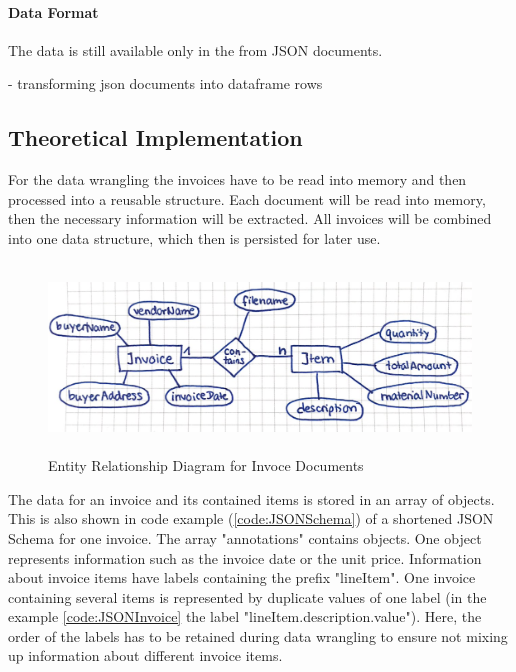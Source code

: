 \begin{table}[ht]
\begin{tabular}{c|lll}
            \end{tabular}
            \label{tabelle:storage}
        \end{table}
        
        \paragraph{Data Format}
        The data is still available only in the from \ac{JSON} documents.
        
        - transforming json documents into dataframe rows
        
    \subsection{Theoretical Implementation}
    For the data wrangling the invoices have to be read into memory and then processed into a reusable structure. Each document will be read into memory, then the necessary information will be extracted. All invoices will be combined into one data structure, which then is persisted for later use.

    \begin{figure}[ht]
        \centering
        \includegraphics[height=5cm]{Bilder/practical/entity_relationship.png}
        \caption{Entity Relationship Diagram for Invoce Documents}
        \label{fig:er}
    \end{figure}

	The data for an invoice and its contained items is stored in an array of objects. This is also shown in code example (\ref{code:JSONSchema}) of a shortened JSON Schema for one invoice. The array "annotations" contains objects. One object represents information such as the invoice date or the unit price. 
	Information about invoice items have labels containing the prefix "lineItem". One invoice containing several items is represented by duplicate values of one label (in the example \ref{code:JSONInvoice} the label "lineItem.description.value"). Here, the order of the labels has to be retained during data wrangling to ensure not mixing up information about different invoice items.

